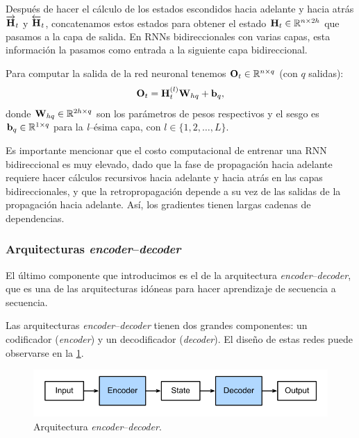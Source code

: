\documentclass[12pt]{article}
\newcommand{\R}{\mathbb{R}}
\newcommand{\hi}{\bm{\textbf H}}
\newcommand{\we}{\bm{\textbf W}}
\newcommand{\bi}{\bm{\textbf b}}
\newcommand{\out}{\bm{\textbf O}}
\begin{document}
Después de hacer el cálculo de los estados escondidos hacia adelante y hacia atrás $ \overrightarrow{\hi}_t $ y $ \overleftarrow{\hi}_t $, concatenamos estos estados para obtener el estado $ \hi_t \in \R^{n \times 2h} $ que pasamos a la capa de salida. En RNNs bidireccionales con varias capas, esta información la pasamos como entrada a la siguiente capa bidireccional. 

Para computar la salida de la red neuronal tenemos $ \out_t \in \R^{n \times q} $ (con $ q $ salidas):
\begin{equation}
    \out_t = \hi_t^{(l)}\we_{hq} + \bi_q,
\end{equation}
donde $ \we_{hq} \in \R^{2h \times q} $ son los parámetros de pesos respectivos y el sesgo es $ \bi_q \in \R^{1 \times q} $ para la \textit{l}--ésima capa, con $l \in \{1, 2, \ldots, L\}$.

Es importante mencionar que el costo computacional de entrenar una RNN bidireccional es muy elevado, dado que la fase de propagación hacia adelante requiere hacer cálculos recursivos hacia adelante y hacia atrás en las capas bidireccionales, y que la retropropagación depende a su vez de las salidas de la propagación hacia adelante. Así, los gradientes tienen largas cadenas de dependencias.

\subsubsection{Arquitecturas \textit{encoder}--\textit{decoder}}

El último componente que introducimos es el de la arquitectura \textit{encoder}--\textit{decoder}, que es una de las arquitecturas idóneas para hacer aprendizaje de secuencia a secuencia. 

Las arquitecturas \textit{encoder}--\textit{decoder} tienen dos grandes componentes: un codificador (\textit{encoder}) y un decodificador (\textit{decoder}). El diseño de estas redes puede observarse en la \cref{fig:encoder-decoder}.

\begin{figure}
    \centering
    \includegraphics[width=0.7\linewidth]{images/encoder-decoder}
    \caption{Arquitectura \textit{encoder}--\textit{decoder}.}
    \label{fig:encoder-decoder}
\end{figure}
\end{document}
